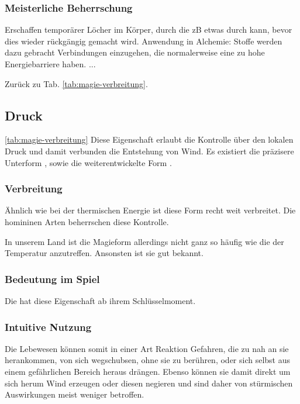 \subsubsection{Meisterliche Beherrschung} 
\begin{outline}
	\1 Erschaffen temporärer Löcher im Körper, durch die zB etwas durch kann, bevor dies wieder rückgängig gemacht wird.
	\1 Anwendung in Alchemie: Stoffe werden dazu gebracht Verbindungen einzugehen, die normalerweise eine zu hohe Energiebarriere haben.
	\1 ...
\end{outline}
Zurück zu Tab. \ref{tab:magie-verbreitung}.



\subsection{Druck}\label{sec:druckmagie} \ref{tab:magie-verbreitung}
Diese Eigenschaft erlaubt die Kontrolle über den lokalen Druck und damit verbunden die Entstehung von Wind. Es existiert die präzisere Unterform , sowie die weiterentwickelte Form .

\subsubsection{Verbreitung}
Ähnlich wie bei der thermischen Energie ist diese Form recht weit verbreitet. Die homininen Arten beherrschen diese Kontrolle. 

In unserem Land ist die Magieform allerdings nicht ganz so häufig wie die der Temperatur anzutreffen. Ansonsten ist sie gut bekannt.

\subsubsection{Bedeutung im Spiel}
Die  hat diese Eigenschaft ab ihrem Schlüsselmoment. 

\subsubsection{Intuitive Nutzung}
Die Lebewesen können somit in einer Art Reaktion Gefahren, die zu nah an sie herankommen, von sich wegschubsen, ohne sie zu berühren, oder sich selbst aus einem gefährlichen Bereich heraus drängen. Ebenso können sie damit direkt um sich herum Wind erzeugen oder diesen negieren und sind daher von stürmischen Auswirkungen meist weniger betroffen.

